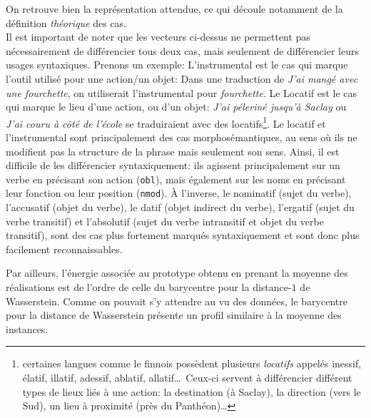 \documentclass{cours}
\begin{document}
On retrouve bien la représentation attendue, ce qui découle notamment de la définition \emph{théorique} des cas. \\
Il est important de noter que les vecteurs ci-dessus ne permettent pas nécessairement de différencier tous deux cas, mais seulement de différencier leurs usages syntaxiques.
Prenons un exemple:
L'instrumental est le cas qui marque l'outil utilisé pour une action/un objet: Dans une traduction de \textsl{J'ai mangé \emph{avec} une fourchette}, on utiliserait l'instrumental pour \textsl{fourchette}.
Le Locatif est le cas qui marque le lieu d'une action, ou d'un objet: \textsl{J'ai péleriné jusqu'à Saclay} ou \textsl{J'ai couru à côté de l'école} se traduiraient avec des locatifs\footnote{certaines langues comme le finnois possèdent plusieurs \textit{locatifs} appelés inessif, élatif, illatif, adessif, ablatif, allatif\dots\ Ceux-ci servent à différencier différent types de lieux liés à une action: la destination (à Saclay), la direction (vers le Sud), un lieu à proximité (près du Panthéon)\ldots}.
Le locatif et l'instrumental sont principalement des cas morphosémantiques, au sens où ils ne modifient pas la structure de la phrase mais seulement son sens.
Ainsi, il est difficile de les différencier syntaxiquement: ils agissent principalement sur un verbe en précisant son action (\texttt{obl}), mais également sur les noms en précisant leur fonction ou leur position (\texttt{nmod}).
À l'inverse, le nominatif (sujet du verbe), l'accusatif (objet du verbe), le datif (objet indirect du verbe), l'ergatif (sujet du verbe transitif) et l'absolutif (sujet du verbe intransitif et objet du verbe transitif), sont des cas plus fortement marqués syntaxiquement et sont donc plus facilement reconnaissables.

\medskip
Par ailleurs, l'énergie associée au prototype obtenu en prenant la moyenne des réalisations est de l'ordre de celle du barycentre pour la distance-$1$ de Wasserstein.
Comme on pouvait s'y attendre au vu des données, le barycentre pour la distance de Wasserstein présente un profil similaire à la moyenne des instances.
\end{document}
